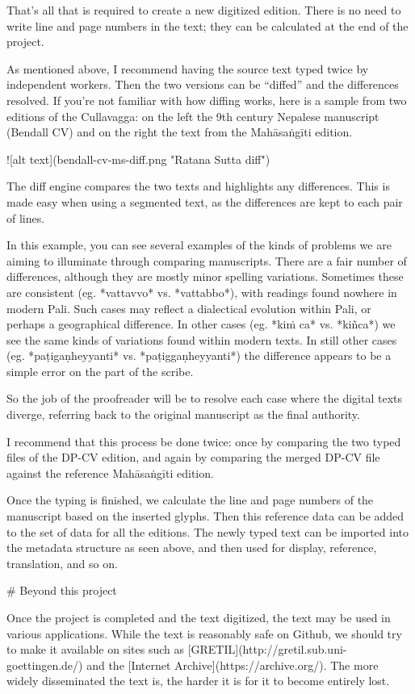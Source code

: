 \documentclass[11pt, openany,a5paper]{article}
\begin{document}
\begin{markdown}
That’s all that is required to create a new digitized edition. There is no need to write line and page numbers in the text; they can be calculated at the end of the project.

As mentioned above, I recommend having the source text typed twice by independent workers. Then the two versions can be “diffed” and the differences resolved. If you’re not familiar with how diffing works, here is a sample from two editions of the Cullavagga: on the left the 9th century Nepalese manuscript (Bendall CV) and on the right the text from the Mahāsaṅgīti edition.

![alt text](bendall-cv-ms-diff.png "Ratana Sutta diff")

The diff engine compares the two texts and highlights any differences. This is made easy when using a segmented text, as the differences are kept to each pair of lines.

In this example, you can see several examples of the kinds of problems we are aiming to illuminate through comparing manuscripts. There are a fair number of differences, although they are mostly minor spelling variations. Sometimes these are consistent (eg. *vattavvo* vs. *vattabbo*), with readings found nowhere in modern Pali. Such cases may reflect a dialectical evolution within Pali, or perhaps a geographical difference. In other cases (eg. *kiṁ ca* vs. *kiñca*) we see the same kinds of variations found within modern texts. In still other cases (eg. *paṭigaṇheyyanti* vs. *paṭiggaṇheyyanti*) the difference appears to be a simple error on the part of the scribe.

So the job of the proofreader will be to resolve each case where the digital texts diverge, referring back to the original manuscript as the final authority.

I recommend that this process be done twice: once by comparing the two typed files of the DP-CV edition, and again by comparing the merged DP-CV file against the reference Mahāsaṅgīti edition.

Once the typing is finished, we calculate the line and page numbers of the manuscript based on the inserted glyphs. Then this reference data can be added to the set of data for all the editions. The newly typed text can be imported into the metadata structure as seen above, and then used for display, reference, translation, and so on.

# Beyond this project

Once the project is completed and the text digitized, the text may be used in various applications. While the text is reasonably safe on Github, we should try to make it available on sites such as [GRETIL](http://gretil.sub.uni-goettingen.de/) and the [Internet Archive](https://archive.org/). The more widely disseminated the text is, the harder it is for it to become entirely lost.


\end{markdown}
\end{document}

